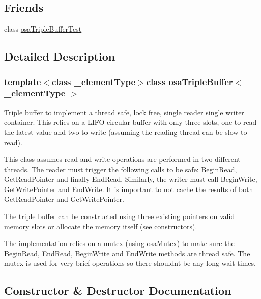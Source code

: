 \subsection*{Friends}
\begin{DoxyCompactItemize}
\item 
class \hyperlink{classosa_triple_buffer_aa5453762a45f68872c7b49a51f962e9c}{osa\+Triple\+Buffer\+Test}
\end{DoxyCompactItemize}


\subsection{Detailed Description}
\subsubsection*{template$<$class \+\_\+element\+Type$>$class osa\+Triple\+Buffer$<$ \+\_\+element\+Type $>$}

Triple buffer to implement a thread safe, lock free, single reader single writer container. This relies on a L\+I\+F\+O circular buffer with only three slots, one to read the latest value and two to write (assuming the reading thread can be slow to read).

This class assumes read and write operations are performed in two different threads. The reader must trigger the following calls to be safe\+: Begin\+Read, Get\+Read\+Pointer and finally End\+Read. Similarly, the writer must call Begin\+Write, Get\+Write\+Pointer and End\+Write. It is important to not cache the results of both Get\+Read\+Pointer and Get\+Write\+Pointer.

The triple buffer can be constructed using three existing pointers on valid memory slots or allocate the memory itself (see constructors).

The implementation relies on a mutex (using \hyperlink{classosa_mutex}{osa\+Mutex}) to make sure the Begin\+Read, End\+Read, Begin\+Write and End\+Write methods are thread safe. The mutex is used for very brief operations so there shouldn\textquotesingle{}t be any long wait times. 

\subsection{Constructor \& Destructor Documentation}
\hypertarget{classosa_triple_buffer_af685c6dd30e1eb800ef6df3f8074ef1a}{}
